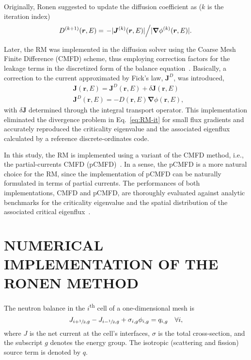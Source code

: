 \documentclass[letterpaper]{mc2021}
\newcommand{\tsup}[1]{\textsuperscript{#1}}
\newcommand{\rr}{\bm{r}}
\newcommand{\rE}{\ensuremath{(\rr,E)}}
\newcommand{\bnabla}{\ensuremath{\bm{\nabla}}}
\newcommand{\hzi}{\ensuremath{\sfrac{1}{2}}}
\begin{document}
\vspace{-1.5mm}

Originally, Ronen suggested to update the diffusion coefficient as ($k$ is the iteration index)~\cite{Ronen-2004}
\begin{equation}
\label{eq:RM-it}
D^{(k+1)}\rE = \left. - \lvert \bm{J}^{(k)}\rE \rvert \middle/ \lvert \bnabla \phi^{(k)}\rE \rvert. \right.
\end{equation}

\vspace{-10.5mm}

Later, the RM was implemented in the diffusion solver using the Coarse Mesh Finite Difference (CMFD) scheme, thus employing correction factors for the leakage terms in the discretized form of the balance equation~\cite{Tomatis-2011,Gross-2020}. Basically, a correction to the current approximated by Fick's law, $\bm{J}^D$, was introduced,
\begin{align}
\label{eq:Fick}
& \bm{J}\rE = \bm{J}^D\rE + \delta\bm{J}\rE \\ 
& \bm{J}^D\rE = -D\rE\bnabla\phi\rE,
\end{align}
with $\delta\bm{J}$ determined through the integral transport operator.  This implementation eliminated the divergence problem in Eq.~\eqref{eq:RM-it} for small flux gradients and accurately reproduced the criticality eigenvalue and the associated eigenflux calculated by a reference discrete-ordinates code.

\vspace{-1.5mm}

In this study, the RM is implemented using a variant of the CMFD method, i.e., the partial-currents CMFD (pCMFD)~\cite{Cho-2003}. In a sense, the pCMFD is a more natural choice for the RM, since the implementation of pCMFD can be naturally formulated in terms of partial currents. The performances of both implementations, CMFD and pCMFD, are thoroughly evaluated against analytic benchmarks for the criticality eigenvalue and the spatial distribution of the associated critical eigenflux~\cite{Sood2003}.    

\section{NUMERICAL IMPLEMENTATION OF THE RONEN METHOD} 
\label{sec:num-imp}

The neutron balance in the $i$\tsup{th} cell of a one-dimensional mesh is
\begin{equation}
\label{eq:balance}
J_{i+\hzi,g} - J_{i-\hzi,g} + \sigma_{i,g} \phi_{i,g} = q_{i,g} \quad \forall i,
\end{equation}
where $J$ is the net current at the cell's interfaces, $\sigma$ is the total cross-section, and the subscript $g$ denotes the energy group. The isotropic (scattering and fission) source term is denoted by $q$.
\end{document}
